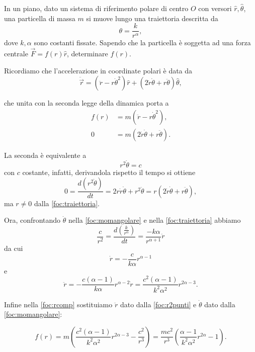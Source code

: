 \documentclass[../main.tex]{subfiles}
\begin{document}

\textex
In un piano, dato un sistema di riferimento polare di centro $O$ con versori $\hat{r},\hat{\theta}$, una particella di massa $m$ si muove lungo una traiettoria descritta da
\begin{equation}
	\label{foc:traiettoria}
	\theta=\frac{k}{r^\alpha},
\end{equation}
dove $k, \alpha$ sono costanti fissate. Sapendo che la particella \`e soggetta ad una forza centrale $\vec{F}=f(r)\hat{r}$, determinare $f(r)$.

\solution

Ricordiamo che l'accelerazione in coordinate polari \`e data da
\[
	\ddot{\vec{r}}=(\ddot{r}-r\dot{\theta}^2)\hat{r}+(2\dot{r}\dot{\theta}+r\ddot{\theta})\hat{\theta},
\]

che unita con la seconda legge della dinamica porta a
\begin{align}
	f(r)&=m(\ddot{r}-r\dot{\theta}^2), \label{foc:rcomp}\\
	0&=m(2\dot{r}\dot{\theta}+r\ddot{\theta}).
\end{align}

La seconda \`e equivalente a
\begin{equation}
	\label{foc:momangolare}	
	r^2\dot{\theta}=c
\end{equation}
con $c$ costante, infatti, derivandola  rispetto il tempo si ottiene
\[
	0=\frac{d(r^2\dot{\theta})}{dt}=2r\dot{r}\dot{\theta}+r^2\ddot{\theta}=r(2\dot{r}\dot{\theta}+r\ddot{\theta}),
\]
ma $r\neq 0$ dalla \cref{foc:traiettoria}.

Ora, confrontando $\dot{\theta}$ nella \cref{foc:momangolare} e nella \cref{foc:traiettoria}	abbiamo
\[
	\frac{c}{r^2}=\frac{d\left(\frac{k}{r^{\alpha}}\right)}{dt}=\frac{-k\alpha}{r^{\alpha+1}}\dot{r}
\]
da cui
\[
	\dot{r}=-\frac{c}{k\alpha}r^{\alpha-1}
\]
e
\begin{equation}
	\label{foc:r2punti}
	\ddot{r}=-\frac{c(\alpha-1)}{k\alpha}r^{\alpha-2}\dot{r}=\frac{c^2(\alpha-1)}{k^2\alpha^2}r^{2\alpha-3}.
\end{equation}

Infine nella \cref{foc:rcomp} sostituiamo $\ddot{r}$ dato dalla \cref{foc:r2punti} e $\dot{\theta}$ dato dalla \cref{foc:momangolare}:

\[
	f(r)=m\left(\frac{c^2(\alpha-1)}{k^2\alpha^2}r^{2\alpha-3}-\frac{c^2}{r^3}\right)
	=\frac{mc^2}{r^3}\left(\frac{\alpha-1}{k^2\alpha^2}r^{2\alpha}-1\right).
\]
\end{document}
